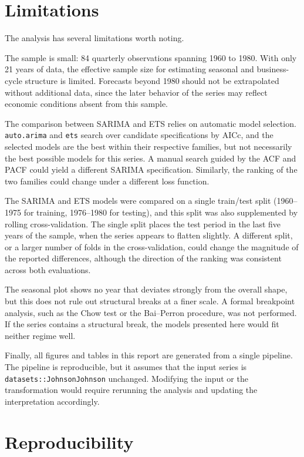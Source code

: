 \documentclass[
  english,
  a4paper,
]{article}
\begin{document}
\section{Limitations}\label{limitations}

The analysis has several limitations worth noting.

The sample is small: 84 quarterly observations spanning 1960 to 1980.
With only 21 years of data, the effective sample size for estimating
seasonal and business-cycle structure is limited. Forecasts beyond 1980
should not be extrapolated without additional data, since the later
behavior of the series may reflect economic conditions absent from this
sample.

The comparison between SARIMA and ETS relies on automatic model
selection. \texttt{auto.arima} and \texttt{ets} search over candidate
specifications by AICc, and the selected models are the best within
their respective families, but not necessarily the best possible models
for this series. A manual search guided by the ACF and PACF could yield
a different SARIMA specification. Similarly, the ranking of the two
families could change under a different loss function.

The SARIMA and ETS models were compared on a single train/test split
(1960--1975 for training, 1976--1980 for testing), and this split was
also supplemented by rolling cross-validation. The single split places
the test period in the last five years of the sample, when the series
appears to flatten slightly. A different split, or a larger number of
folds in the cross-validation, could change the magnitude of the
reported differences, although the direction of the ranking was
consistent across both evaluations.

The seasonal plot shows no year that deviates strongly from the overall
shape, but this does not rule out structural breaks at a finer scale. A
formal breakpoint analysis, such as the Chow test or the Bai--Perron
procedure, was not performed. If the series contains a structural break,
the models presented here would fit neither regime well.

Finally, all figures and tables in this report are generated from a
single pipeline. The pipeline is reproducible, but it assumes that the
input series is \texttt{datasets::JohnsonJohnson} unchanged. Modifying
the input or the transformation would require rerunning the analysis and
updating the interpretation accordingly.

\section{Reproducibility}\label{reproducibility}
\end{document}
